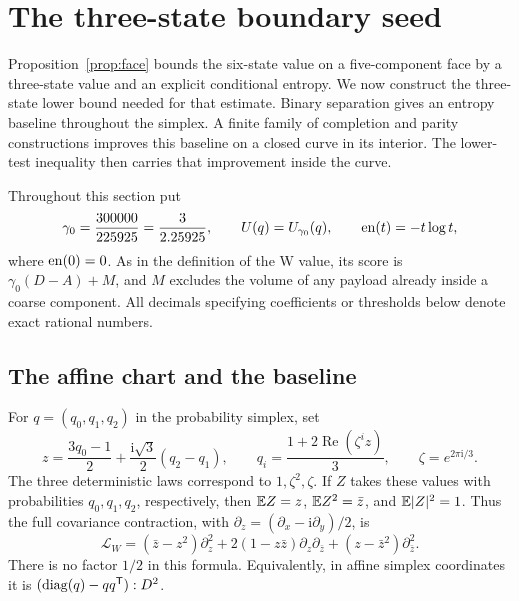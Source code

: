\section{The three-state boundary seed}
\label{cert:w-seed-section}

Proposition~\ref{prop:face} bounds the six-state value on a five-component
face by a three-state value and an explicit conditional entropy.  We now
construct the three-state lower bound needed for that estimate.
Binary separation gives an entropy baseline throughout the simplex.
A finite family of completion and parity constructions improves this baseline
on a closed curve in its interior.  The lower-test inequality then carries
that improvement inside the curve.

Throughout this section put
\[
 \gamma _0=\frac{300000}{225925}=\frac3{2.25925},\qquad
 U(q)=U_{\gamma _0}(q),\qquad \operatorname{en}(t)=-t\log t,
\]
where $\operatorname{en}(0)=0$.  As in the definition of the W value, its score is
$\gamma _0(D-A)+M$, and $M$ excludes the volume of any payload already
inside a coarse component.  All decimals specifying coefficients or
thresholds below denote exact rational numbers.

\subsection{The affine chart and the baseline}

For $q=(q_0,q_1,q_2)$ in the probability simplex, set
\begin{equation}
 z=\frac{3q_0-1}{2}+\frac{\mathrm i\sqrt3}{2}(q_2-q_1),
 \qquad
 q_i=\frac{1+2\operatorname{Re}(\zeta^i z)}3,
 \qquad \zeta=e^{2\pi\mathrm i/3}.
 \label{cert:w-coordinate}
\end{equation}
The three deterministic laws correspond to $1,\zeta^2,\zeta$.
If $Z$ takes these values with probabilities $q_0,q_1,q_2$, respectively,
then $\mathbb E Z=z$, $\mathbb E Z^2=\bar z$, and $\mathbb E|Z|^2=1$.  Thus the full
covariance contraction, with $\partial_z=(\partial_x-\mathrm i\partial_y)/2$,
is
\begin{equation}
 \mathcal L_W
 = (\bar z-z^2)\partial_z^2
   +2(1-z\bar z)\partial_z\partial_{\bar z}
   +(z-\bar z^2)\partial_{\bar z}^2.
 \label{cert:w-operator}
\end{equation}
There is no factor $1/2$ in this formula.  Equivalently, in affine simplex
coordinates it is $(\operatorname{diag}(q)-qq^{\mathsf T}):D^2$.

